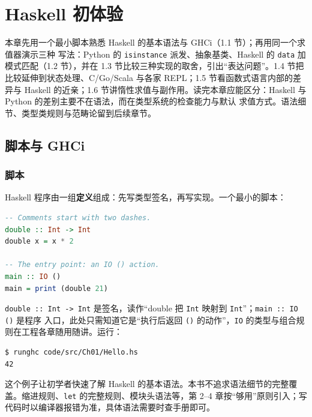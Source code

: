 \chapter{Haskell 初体验}\label{haskell-ux521dux4f53ux9a8c}

本章先用一个最小脚本熟悉 Haskell 的基本语法与 GHCi（1.1 节）；再用同一个求值器演示三种
写法：Python 的 \passthrough{\lstinline!isinstance!} 派发、抽象基类、Haskell 的 \passthrough{\lstinline!data!} 加模式匹配（1.2 节），并在
1.3 节比较三种实现的取舍，引出“表达问题”。1.4 节把比较延伸到状态处理、C/Go/Scala 与各家 REPL；1.5 节看函数式语言内部的差异与 Haskell 的近亲；1.6 节讲惰性求值与副作用。读完本章应能区分：Haskell 与 Python 的差别主要不在语法，而在类型系统的检查能力与默认
求值方式。语法细节、类型类规则与范畴论留到后续章节。

\section{脚本与 GHCi}\label{ux811aux672cux4e0e-ghci}

\subsection{脚本}\label{ux811aux672c}

Haskell 程序由一组\textbf{定义}组成：先写类型签名，再写实现。一个最小的脚本：

\begin{lstlisting}[language=Haskell]
-- Comments start with two dashes.
double :: Int -> Int
double x = x * 2

-- The entry point: an IO () action.
main :: IO ()
main = print (double 21)
\end{lstlisting}

\passthrough{\lstinline!double :: Int -> Int!} 是签名，读作“double 把 \passthrough{\lstinline!Int!} 映射到 \passthrough{\lstinline!Int!}”；\passthrough{\lstinline!main :: IO ()!} 是程序
入口，此处只需知道它是“执行后返回 \passthrough{\lstinline!()!} 的动作”，\passthrough{\lstinline!IO!} 的类型与组合规则在工程各章随用随讲。运行：

\begin{lstlisting}
$ runghc code/src/Ch01/Hello.hs
42
\end{lstlisting}

这个例子让初学者快速了解 Haskell 的基本语法。本书不追求语法细节的完整覆盖。缩进规则、\passthrough{\lstinline!let!} 的完整规则、模块头语法等，第 2--4 章按“够用”原则引入；写代码时以编译器报错为准，具体语法需要时查手册即可。

